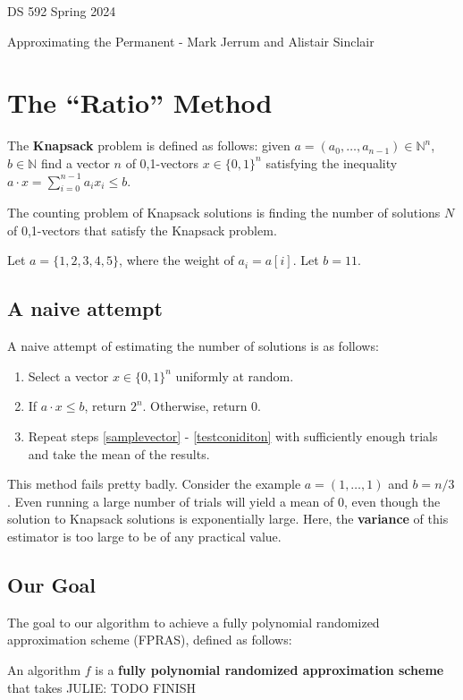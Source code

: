 \documentclass[12pt]{article}
\author{Julie Ha}
\theoremstyle{definition}
\begin{document}
\begin{center}
{\Large DS 592 Spring 2024}

\bigskip

{\Large Approximating the Permanent - Mark Jerrum and Alistair Sinclair}

\smallskip

\end{center}

\section*{The ``Ratio'' Method}

\begin{definition}
	The \textbf{Knapsack} problem is defined as follows: given $a=(a_0,\dots, a_{n-1})\in\mathbb{N}^n$, $b\in\mathbb{N}$ find a vector $n$ of 0,1-vectors $x\in\{0,1\}^n$ satisfying the inequality $a\cdot x = \sum_{i=0}^{n-1}a_i x_i\leq b$. 
\end{definition}
The counting problem of Knapsack solutions is finding the number of solutions $N$ of 0,1-vectors that satisfy the Knapsack problem.

\begin{example}
	Let $a = \{1, 2, 3, 4, 5\}$, where the weight of $a_i = a[i]$. Let $b=11$. 
\end{example}

\subsection*{A naive attempt}
A naive attempt of estimating the number of solutions is as follows: 
\begin{enumerate}
	\item\label{samplevector} Select a vector $x\in\{0,1\}^n$ uniformly at random. 
	\item\label{testconiditon} If $a\cdot x \leq b$, return $2^n$. Otherwise, return 0. 
	\item Repeat steps \ref{samplevector} - \ref{testconiditon} with sufficiently enough trials and take the mean of the results. 
\end{enumerate}
This method fails pretty badly. Consider the example $a=(1,\dots,1)$ and $b=n/3$. Even running a large number of trials will yield a mean of 0, even though the solution to Knapsack solutions is exponentially large. Here, the \textbf{variance} of this estimator is too large to be of any practical value. 

\subsection*{Our Goal}
The goal to our algorithm to achieve a fully polynomial randomized approximation scheme (FPRAS), defined as follows: 
\begin{definition}
	An algorithm $f$ is a \textbf{fully polynomial randomized approximation scheme} that takes 
	JULIE: TODO FINISH 
\end{definition}
\end{document}

